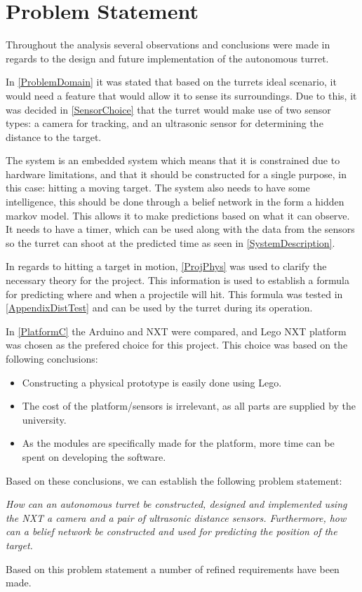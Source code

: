 \chapter{Problem Statement}

Throughout the analysis several observations and conclusions were made in
regards to the design and future implementation of the autonomous turret. 

In \autoref{ProblemDomain} it was stated that based on the turrets ideal
scenario, it would need a feature that would allow it to sense its
surroundings. Due to this, it was decided in \autoref{SensorChoice} that the
turret would make use of two sensor types: a camera for tracking, and an
ultrasonic sensor for determining the distance to the target.\nl

The system is an embedded system which means that it is constrained due to
hardware limitations, and that it should be constructed for a single purpose,
in this case: hitting a moving target. The system also needs to have some
intelligence, this should be done through a belief network in the form a hidden
markov model. This allows it to make predictions based on what it can
observe. It needs to have a timer, which can be used along with the data from
the sensors so the turret can shoot at the predicted time as seen in
\autoref{SystemDescription}.\nl

In regards to hitting a target in motion, \autoref{ProjPhys} was used to
clarify the necessary theory for the project. This information is used to
establish a formula for predicting where and when a projectile will hit. This
formula was tested in \autoref{AppendixDistTest} and can be used by the turret
during its operation.\nl

In \autoref{PlatformC} the Arduino and NXT were compared, and Lego NXT
platform was chosen as the prefered choice for this project. This choice was
based on the following conclusions:
\begin{itemize}
  \item Constructing a physical prototype is easily done using Lego.
  \item The cost of the platform/sensors is irrelevant, as all parts are
  supplied by the university.
  \item As the modules are specifically made for the platform, more time can be
  spent on developing the software.
\end{itemize}

Based on these conclusions, we can establish the following
problem statement:

\begin{center}
\begin{minipage}{0.8\linewidth}
\textit{How can an autonomous turret be constructed, designed and implemented
using the NXT a camera and a pair of ultrasonic distance sensors. Furthermore,
how can a belief network be constructed and used for predicting the position
of the target.}
\end{minipage}
\end{center}

Based on this problem statement a number of refined requirements have been made.
